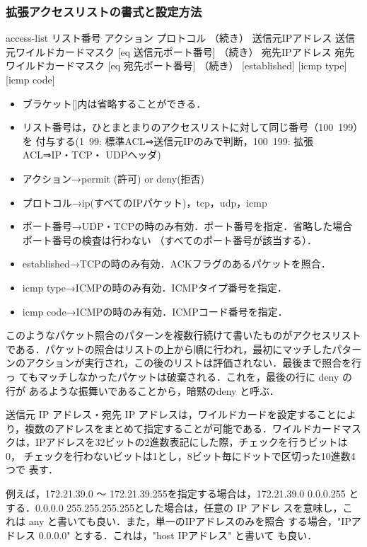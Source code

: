 \subsubsection{拡張アクセスリストの書式と設定方法}

\begin{cli}
[拡張ACL書式]
access-list  リスト番号  アクション  プロトコル
（続き） 送信元IPアドレス  送信元ワイルドカードマスク [eq  送信元ポート番号]
（続き）   宛先IPアドレス    宛先ワイルドカードマスク [eq    宛先ポート番号]
（続き）   [established] [icmp type] [icmp code]
\end{cli}

\begin{itemize}
 \item ブラケット[]内は省略することができる．
 \item リスト番号は，ひとまとまりのアクセスリストに対して同じ番号（100~199）を
付与する(1~99: 標準ACL⇒送信元IPのみで判断，100~199: 拡張ACL⇒IP・TCP・
       UDPヘッダ)
 \item アクション→permit (許可) or deny(拒否)
 \item プロトコル→ip(すべてのIPパケット)，tcp，udp，icmp
 \item ポート番号→UDP・TCPの時のみ有効．ポート番号を指定．省略した場合ポート番号の検査は行わない
（すべてのポート番号が該当する）．
 \item established→TCPの時のみ有効．ACKフラグのあるパケットを照合．
 \item icmp type→ICMPの時のみ有効．ICMPタイプ番号を指定．
 \item icmp code→ICMPの時のみ有効．ICMPコード番号を指定．
\end{itemize}

このようなパケット照合のパターンを複数行続けて書いたものがアクセスリスト
である．パケットの照合はリストの上から順に行われ，最初にマッチしたパター
ンのアクションが実行され，この後のリストは評価されない．最後まで照合を行っ
てもマッチしなかったパケットは破棄される．これを，最後の行に deny の行が
あるような振舞いであることから，暗黙のdeny と呼ぶ．

送信元 IP アドレス・宛先 IP アドレスは，ワイルドカードを設定することによ
り，複数のアドレスをまとめて指定することが可能である．ワイルドカードマス
クは，IPアドレスを32ビットの2進数表記にした際，チェックを行うビットは0，
チェックを行わないビットは1とし，8ビット毎にドットで区切った10進数4つで
表す．

例えば，172.21.39.0 〜 172.21.39.255を指定する場合は，172.21.39.0
0.0.0.255 とする．0.0.0.0 255.255.255.255とした場合は，任意の IP アドレ
スを意味し，これは any と書いても良い．また，単一のIPアドレスのみを照合
する場合，"IPアドレス  0.0.0.0" とする．これは，"host  IPアドレス" と書いて
も良い．

